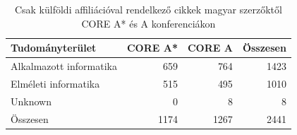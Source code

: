 \begin{table}[h]
  \centering
  \caption{Csak külföldi affiliációval rendelkező cikkek magyar szerzőktől CORE A* és A konferenciákon}
  \label{tab:already_abroad_core_summary}
  \begin{tabular}{l|rr|r}
    \toprule
    Tudományterület & CORE A* & CORE A & Összesen \\
    \midrule
    Alkalmazott informatika & 659 & 764 & 1423 \\
    Elméleti informatika & 515 & 495 & 1010 \\
    Unknown & 0 & 8 & 8 \\
    Összesen & 1174 & 1267 & 2441 \\
    \bottomrule
  \end{tabular}
\end{table}